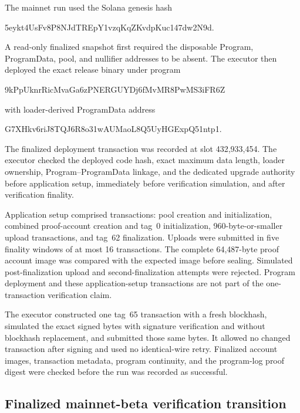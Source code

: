 The mainnet run used the Solana genesis hash
\begin{center}
  \small\ttfamily
  5eykt4UsFv8P8NJdTREpY1vzqKqZKvdpKuc147dw2N9d.
\end{center}
A read-only finalized snapshot first required the disposable Program,
ProgramData, pool, and nullifier addresses to be absent.  The executor then
deployed the exact release binary under program
\begin{center}
  \small\ttfamily
  9kPpUknrRicMvaGa6zPNERGUYDj6fMvMR8PwMS3iFR6Z
\end{center}
with loader-derived ProgramData address
\begin{center}
  \small\ttfamily
  G7XHkv6riJ8TQJ6R8o31wAUMaoL8Q5UyHGExpQ51ntp1.
\end{center}
The finalized deployment transaction was recorded at slot 432,933,454.  The
executor checked the deployed code hash, exact maximum data length, loader
ownership, Program--ProgramData linkage, and the dedicated upgrade authority
before application setup, immediately before verification simulation, and
after verification finality.

Application setup comprised \ProfileMainnetSetupTransactions{} transactions:
pool creation and initialization, combined proof-account creation and tag~0
initialization, \ProfileUploadTransactions{} 960-byte-or-smaller upload
transactions, and tag~62 finalization.  Uploads were submitted in five
finality windows of at most 16 transactions.  The complete 64,487-byte proof
account image was compared with the expected image before sealing.  Simulated
post-finalization upload and second-finalization attempts were rejected.
Program deployment and these application-setup transactions are not part of
the one-transaction verification claim.

The executor constructed one tag~65 transaction with a fresh blockhash,
simulated the exact signed bytes with signature verification and without
blockhash replacement, and submitted those same bytes.  It allowed no changed
transaction after signing and used no identical-wire retry.  Finalized
account images, transaction metadata, program continuity, and the program-log
proof digest were checked before the run was recorded as successful.

\subsection{Finalized mainnet-beta verification transition}
\label{sec:evaluation-mainnet-result}

